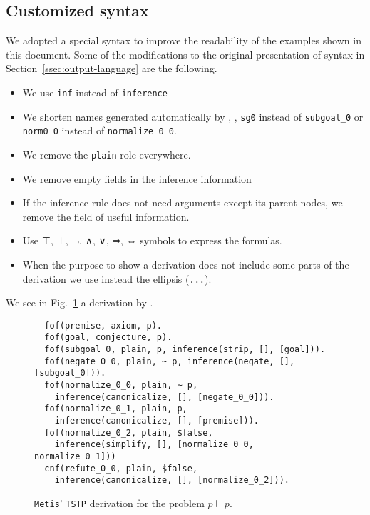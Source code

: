 \documentclass[../main.tex]{subfiles}
\begin{document}
\begin{subappendices}
\section{Customized \TSTP syntax}
\label{app:tstp-syntax}

We adopted a special \TSTP syntax to improve the readability of the \TSTP
examples shown in this document. Some of the modifications to the original
presentation of \TSTP syntax in Section~\ref{ssec:output-language} are the
following.

\begin{itemize}
  \item We use \verb!inf! instead of \verb!inference!
  \item We shorten names generated automatically by \Metis, \eg,
\verb!sg0! instead of \verb!subgoal_0! or \verb!norm0_0!
instead of \verb!normalize_0_0!.
  \item We remove the \verb!plain! role everywhere.
  \item We remove empty fields in the inference information
  \item If the inference rule does not need arguments except its parent nodes, we remove the field of useful information.
  \item Use ⊤, ⊥, ¬, ∧, ∨, ⇒, ⇔ symbols to express the formulas.
  \item When the purpose to show a \TSTP derivation does not include
  some parts of the derivation we use instead the ellipsis (\verb!...!).
\end{itemize}

We see in Fig.~\ref{fig:metis-proof-tstp} a  \TSTP derivation by \Metis.

\begin{figure}[!h]
\begin{verbatim}
  fof(premise, axiom, p).
  fof(goal, conjecture, p).
  fof(subgoal_0, plain, p, inference(strip, [], [goal])).
  fof(negate_0_0, plain, ~ p, inference(negate, [], [subgoal_0])).
  fof(normalize_0_0, plain, ∼ p,
    inference(canonicalize, [], [negate_0_0])).
  fof(normalize_0_1, plain, p,
    inference(canonicalize, [], [premise])).
  fof(normalize_0_2, plain, $false,
    inference(simplify, [], [normalize_0_0, normalize_0_1]))
  cnf(refute_0_0, plain, $false,
    inference(canonicalize, [], [normalize_0_2])).
\end{verbatim}
\caption{\texttt{Metis}' \texttt{TSTP} derivation for the
problem $p\vdash p$.}
\label{fig:metis-proof-tstp}
\end{figure}


\end{subappendices}
\end{document}
